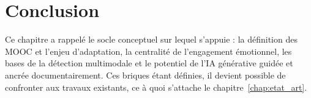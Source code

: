 \section{Conclusion}
\label{sec:fond-concl}

Ce chapitre a rappelé le socle conceptuel sur lequel s'appuie \emolearn{} :
la définition des MOOC et l'enjeu d'adaptation, la centralité de
l'engagement émotionnel, les bases de la détection multimodale et le
potentiel de l'IA générative guidée et ancrée documentairement. Ces
briques étant
définies, il devient possible de confronter \emolearn{} aux travaux
existants, ce à quoi s'attache le chapitre~\ref{chap:etat_art}.
